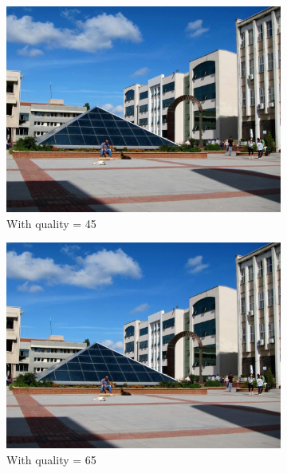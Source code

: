 \documentclass[12pt]{article}
\begin{document}
\begin{figure}[H]
\begin{subfigure}{0.45\textwidth}
        \includegraphics[height=0.75\textwidth]{images/kuzey-45.jpg}
        \caption{With quality = 45}
        \label{jpeg-45}
    \end{subfigure}
    \begin{subfigure}{0.45\textwidth}
        \centering
        \includegraphics[height=0.75\textwidth]{images/kuzey-65.jpg}
        \caption{With quality = 65}
        \label{jpeg-65}
    \end{subfigure}
    \begin{subfigure}{0.45\textwidth}
        \centering

\end{subfigure}
\end{figure}
\end{document}

